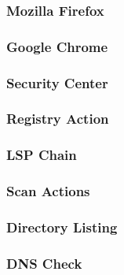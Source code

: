 \subsubsection{Mozilla Firefox}
\subsubsection{Google Chrome}
\subsubsection{Security Center}
\subsubsection{Registry Action}
\subsubsection{LSP Chain}
\subsubsection{Scan Actions}
\subsubsection{Directory Listing}
\subsubsection{DNS Check}